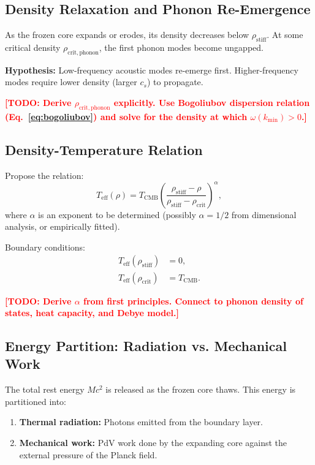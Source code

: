 \documentclass[11pt,a4paper]{article}
\newcommand{\rhocrit}{\ensuremath{\rho_{\mathrm{crit}}}}
\newcommand{\rhostiff}{\ensuremath{\rho_{\mathrm{stiff}}}}
\newcommand{\cs}{\ensuremath{c_s}}
\newcommand{\Teff}{\ensuremath{T_{\mathrm{eff}}}}
\newcommand{\TCMB}{\ensuremath{T_{\mathrm{CMB}}}}
\newcommand{\TODO}[1]{\textcolor{red}{\textbf{[TODO: #1]}}}
\theoremstyle{definition}
\theoremstyle{remark}
\begin{document}
\subsection{Density Relaxation and Phonon Re-Emergence}
\label{sec:phonon_reemergence}

As the frozen core expands or erodes, its density decreases below $\rhostiff$. At some critical density $\rho_{\mathrm{crit,phonon}}$, the first phonon modes become ungapped.

\vspace{0.5em}
\noindent
\textbf{Hypothesis:} Low-frequency acoustic modes re-emerge first. Higher-frequency modes require lower density (larger $\cs$) to propagate.

\TODO{Derive $\rho_{\mathrm{crit,phonon}}$ explicitly. Use Bogoliubov dispersion relation (Eq.~\ref{eq:bogoliubov}) and solve for the density at which $\omega(k_{\min}) > 0$.}

\subsection{Density-Temperature Relation}
\label{sec:density_temperature}

Propose the relation:
\begin{equation}
\Teff(\rho) = \TCMB \left( \frac{\rhostiff - \rho}{\rhostiff - \rhocrit} \right)^\alpha,
\label{eq:Teff_rho}
\end{equation}
where $\alpha$ is an exponent to be determined (possibly $\alpha = 1/2$ from dimensional analysis, or empirically fitted).

\vspace{0.5em}
\noindent
Boundary conditions:
\begin{align}
\Teff(\rhostiff) &= 0, \\
\Teff(\rhocrit) &= \TCMB.
\end{align}

\TODO{Derive $\alpha$ from first principles. Connect to phonon density of states, heat capacity, and Debye model.}

\subsection{Energy Partition: Radiation vs. Mechanical Work}
\label{sec:energy_partition}

The total rest energy $Mc^2$ is released as the frozen core thaws. This energy is partitioned into:
\begin{enumerate}[leftmargin=*, itemsep=0.3em]
\item \textbf{Thermal radiation:} Photons emitted from the boundary layer.
\item \textbf{Mechanical work:} PdV work done by the expanding core against the external pressure of the Planck field.
\end{enumerate}
\end{document}
